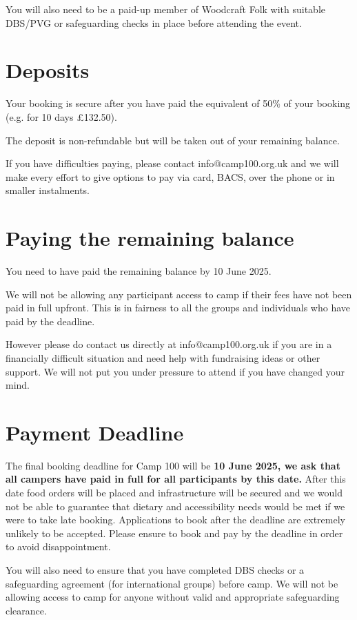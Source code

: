 \documentclass[a4paper, 11pt]{report}
\begin{document}
You will also need to be a paid-up member of Woodcraft Folk with suitable DBS/PVG or safeguarding checks in place before attending the event. 

\section{Deposits}
Your booking is secure after you have paid the equivalent of 50\% of your booking (e.g. for 10 days £132.50). 

The deposit is non-refundable but will be taken out of your remaining balance.

If you have difficulties paying, please contact info@camp100.org.uk and we will make every effort to give options to pay via card, BACS, over the phone or in smaller instalments. 

\section{Paying the remaining balance}
You need to have paid the remaining balance by 10 June 2025.

We will not be allowing any participant access to camp if their fees have not been paid in full upfront. This is in fairness to all the groups and individuals who have paid by the deadline.

However please do contact us directly at info@camp100.org.uk if you are in a financially difficult situation and need help with fundraising ideas or other support. We will not put you under pressure to attend if you have changed your mind.

\section{Payment Deadline}
The final booking deadline for Camp 100 will be \textbf{10 June 2025, we ask that all campers have paid in full for all participants by this date.} After this date food orders will be placed and infrastructure will be secured and we would not be able to guarantee that dietary and accessibility needs would be met if we were to take late booking. Applications to book after the deadline are extremely unlikely to be accepted. Please ensure to book and pay by the deadline in order to avoid disappointment. 

You will also need to ensure that you have completed DBS checks or a safeguarding agreement (for international groups) before camp. We will not be allowing access to camp for anyone without valid and appropriate safeguarding clearance. 
\end{document}
